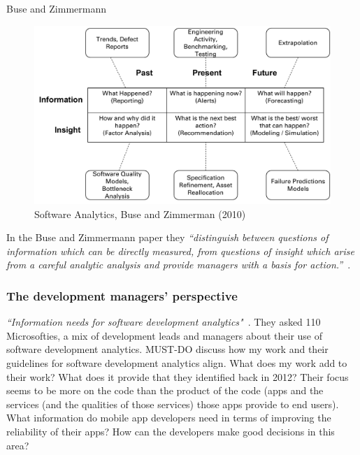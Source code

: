 Buse and Zimmermann
\begin{figure}
    \centering
    \includegraphics[width=\linewidth]{images/related-work/buse_and_zimmermann_2010_figure_a.pdf}
    \caption{Software Analytics, Buse and Zimmerman (2010)}
    \label{fig:software_analytics_buse_and_zimmerman_2010}
\end{figure}


In the Buse and Zimmermann paper they \emph{``distinguish between questions of information which can be directly measured, from questions of insight which arise from a careful analytic analysis and provide managers with a basis for action.''}~.

\subsubsection{The development managers' perspective}
\emph{``Information needs for software development analytics"}~\cite{buse2012_information_needs_for_software_development_analytics}. They asked 110 Microsofties, a mix of development leads and managers about their use of software development analytics. MUST-DO discuss how my work and their guidelines for software development analytics align. What does my work add to their work? What does it provide that they identified back in 2012? Their focus seems to be more on the code than the product of the code (apps and the services (and the qualities of those services) those apps provide to end users). What information do mobile app developers need in terms of improving the reliability of their apps? How can the developers make good decisions in this area?


